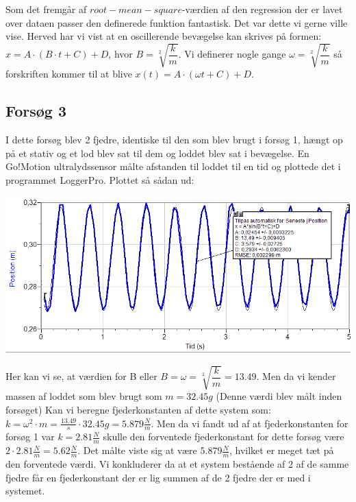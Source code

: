 Som det fremgår af $root-mean-square$-værdien af den regression der er lavet over dataen passer den definerede funktion fantastisk. Det var dette vi gerne ville vise. Herved har vi vist at en oscillerende bevægelse kan skrives på formen: $x = A \cdot (B \cdot t + C) + D$, hvor $B=\sqrt[2]{\dfrac{k}{m}}$. Vi definerer nogle gange $\omega = \sqrt[2]{\dfrac{k}{m}}$ så forskriften kommer til at blive $x(t) = A \cdot (\omega t + C) + D$.

\subsection{Forsøg 3}
I dette forsøg blev 2 fjedre, identiske til den som blev brugt i forsøg 1, hængt op på et stativ og et lod blev sat til dem og loddet blev sat i bevægelse. En Go!Motion ultralydssensor målte afstanden til loddet til en tid og plottede det i programmet LoggerPro. Plottet så sådan ud:

\begin{center}
\includegraphics[scale=0.7]{Billeder/graf3}
\end{center}

Her kan vi se, at værdien for B eller $B = \omega = \sqrt[2]{\dfrac{k}{m}}=13.49$. Men da vi kender massen af loddet som blev brugt som $m=32.45g$ (Denne værdi blev målt inden forsøget) Kan vi beregne fjederkonstanten af dette system som:
$k=\omega^2 \cdot m = \frac{13.49}{s} \cdot 32.45g = 5.879 \frac{N}{m}$. Men da vi fandt ud af at fjederkonstanten for forsøg 1 var $k=2.81\frac{N}{m}$ skulle den forventede fjederkonstant for dette forsøg være $2 \cdot 2.81 \frac{N}{m}= 5.62 \frac{N}{m}$. Det målte viste sig at være $5.879 \frac{N}{m}$, hvilket er meget tæt på den forventede værdi. Vi konkluderer da at et system bestående af 2 af de samme fjedre får en fjederkonstant der er lig summen af de 2 fjedre der er med i systemet. 

